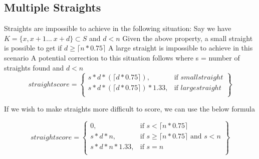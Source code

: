 \documentclass{article}
\begin{document}
\subsection{Multiple Straights}
Straights are impossible to achieve in the following situation: \newline
Say we have $K = \{x, x + 1\dots\ x + d\} \subset S$ and $d  <  n $\newline
Given the above property, a small straight is possible to get if $d \geq \lceil n * 0.75 \rceil$ \newline
A large straight is impossible to achieve in this scenario \newline
\newline
A potential correction to this situation follows where \newline s = number of straights found and \newline $d < n$
\begin{equation}
straightscore = 
\left\{
    \begin{array}{lr}
        s * d * (\lceil d * 0.75 \rceil), & \text{if } smallstraight\\
        s * d * (\lceil d * 0.75 \rceil) * 1.33, & \text{if } largestraight\\
    \end{array}
\right\}
\end{equation}

If we wish to make straights more difficult to score, we can use the below formula

\begin{equation}
straightscore = 
\left\{
    \begin{array}{lr}
    	0, & \text{if } s < \lceil n * 0.75 \rceil\\
        s * d * n, & \text{if } s \geq \lceil n * 0.75 \rceil \text{ and } s < n\\
        s * d * n * 1.33, & \text{if } s = n\\
    \end{array}
\right\}
\end{equation}
\end{document}
